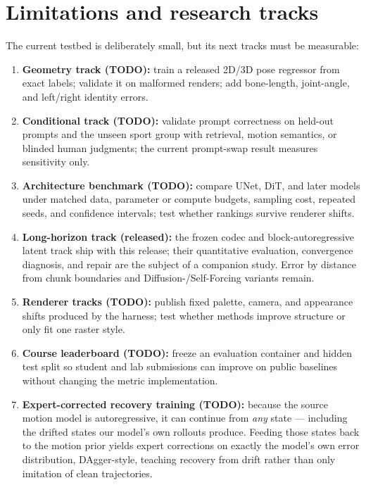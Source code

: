 \documentclass[10pt,twocolumn]{article}
\begin{document}
\section{Limitations and research tracks}\label{sec:future}
{\small
The current testbed is deliberately small, but its next tracks must be measurable:
\begin{enumerate}
\item \textbf{Geometry track (TODO):} train a released 2D/3D pose regressor from exact labels; validate it on malformed
renders; add bone-length, joint-angle, and left/right identity errors.
\item \textbf{Conditional track (TODO):} validate prompt correctness on held-out prompts and the unseen sport group
with retrieval, motion semantics, or blinded human judgments; the current prompt-swap result measures sensitivity only.
\item \textbf{Architecture benchmark (TODO):} compare UNet, DiT, and later models under matched data, parameter or
compute budgets, sampling cost, repeated seeds, and confidence intervals; test whether rankings survive renderer shifts.
\item \textbf{Long-horizon track (released):} the frozen codec and block-autoregressive latent track ship with this
release; their quantitative evaluation, convergence diagnosis, and repair are the subject of a companion study.
Error by distance from chunk boundaries and Diffusion-/Self-Forcing variants remain.
\item \textbf{Renderer tracks (TODO):} publish fixed palette, camera, and appearance shifts produced by the harness;
test whether methods improve structure or only fit one raster style.
\item \textbf{Course leaderboard (TODO):} freeze an evaluation container and hidden test split so student and lab
submissions can improve on public baselines without changing the metric implementation.
\item \textbf{Expert-corrected recovery training (TODO):} because the source motion model is autoregressive, it can
continue from \emph{any} state — including the drifted states our model's own rollouts produce. Feeding those states
back to the motion prior yields expert corrections on exactly the model's own error distribution, DAgger-style,
teaching recovery from drift rather than only imitation of clean trajectories.
\end{enumerate}
}
\end{document}
